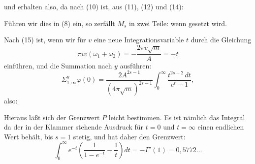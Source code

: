 und erhalten also, da nach (10)
ist, aus (11), (12) und (14):

Führen wir dies in (8) ein, so zerfällt $M_s$ in zwei Teile:
wenn
gesetzt wird.

Nach (15) ist, wenn wir für $v$ eine neue Integrationsvariable
$t$ durch die Gleichung
\[ \pi iv(\omega_1+\omega_2) = -\frac{2\pi v\sqrt{m}}{A} = -t \]
einführen, und die Summation nach $y$ ausführen:
\[ \Sigma_{1,\infty}^{y}\varphi(0) = \frac{2A^{2s-1}}{(4\pi\sqrt{m})^{2s-1}}\int_0^\infty\frac{t^{2s-2}\,dt}{e^t-1}, \]
also:

Hieraus läßt sich der Grenzwert $P$ leicht bestimmen. Es
ist nämlich das Integral
da der in der Klammer stehende Ausdruck für $t=0$ und $t=\infty$
einen endlichen Wert behält, bis $s=1$ stetig, und hat daher
den Grenzwert:
\[ \int_0^\infty e^{-t}\left(\frac{1}{1-e^{-t}}-\frac{1}{t}\right)dt = -\Gamma'(1) = 0{,}5772\ldots \]
